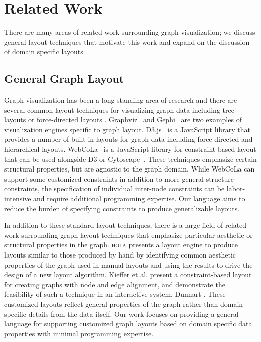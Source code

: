 \section{Related Work}
There are many areas of related work surrounding graph visualization; we
discuss general layout techniques that motivate this work and expand on the
discussion of domain specific layouts.

\subsection{General Graph Layout}
Graph visualization has been a long-standing area of research and there are
several common layout techniques for visualizing graph data including tree
layouts or force-directed layouts
\cite{herman2000graph,eades2010graph}. Graphviz~\cite{ellson2001graphviz}
and Gephi~\cite{bastian2009gephi} are two examples of visualization engines
specific to graph layout. D3.js~\cite{bostock:d3} is a JavaScript library
that provides a number of built in layouts for graph data including
force-directed and hierarchical layouts. WebCoLa~\cite{WebCoLa} is a
JavaScript library for constraint-based layout that can be used alongside
D3 or Cytoscape~\cite{shannon2003cytoscape}. These techniques emphasize
certain structural properties, but are agnostic to the graph domain. While
WebCoLa can support some customized constraints in addition to more general
structure constraints, the specification of individual inter-node
constraints can be labor-intensive and require additional programming
expertise. Our language aims to reduce the burden of specifying constraints
to produce generalizable layouts.

In addition to these standard layout techniques, there is a large field of
related work surrounding graph layout techniques that emphasize particular
aesthetic or structural properties in the graph. \textsc{hola}
\cite{kieffer2016hola} presents a layout engine to produce layouts similar
to those produced by hand by identifying common aesthetic properties of the
graph used in manual layouts and using the results to drive the design of a
new layout algorithm. Kieffer et al. \cite{kieffer2013incremental} present
a constraint-based layout for creating graphs with node and edge alignment,
and demonstrate the feasibility of such a technique in an interactive
system, Dunnart \cite{dwyer2008dunnart}. These customized layouts reflect
general properties of the graph rather than domain specific details from
the data itself. Our work focuses on providing a general language for
supporting customized graph layouts based on domain specific data
properties with minimal programming expertise.

